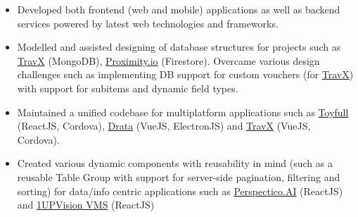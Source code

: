 \documentclass[10pt,a4paper,ragged2e]{maltacv}
\begin{document}
\begin{itemize}
  \item Developed both frontend (web and mobile) applications as well as backend services powered by latest web technologies and frameworks.
  \item Modelled and assisted designing of database structures for projects such as \href{https://play.google.com/store/apps/details?id=com.travx.app}{TravX} (MongoDB), \href{https://prox.io/}{Proximity.io} (Firestore). Overcame various design challenges such as implementing DB support for custom vouchers (for \href{https://play.google.com/store/apps/details?id=com.travx.app}{TravX}) with support for subitems and dynamic field types. 
  \item Maintained a unified codebase for multiplatform applications such as \href{https://toyfull-app.web.app/}{Toyfull} (ReactJS, Cordova), \href{https://drata.com/}{Drata} (VueJS, ElectronJS) and \href{https://play.google.com/store/apps/details?id=com.travx.app}{TravX} (VueJS, Cordova).
  \item Created various dynamic components with reusability in mind (such as a reusable Table Group with support for server-side pagination, filtering and sorting) for data/info centric applications such as \href{https://www.perspectico.com/}{Perspectico.AI} (ReactJS) and \href{https://www.1upvision.com/}{1UPVision VMS} (ReactJS)

\end{itemize}
\end{document}
